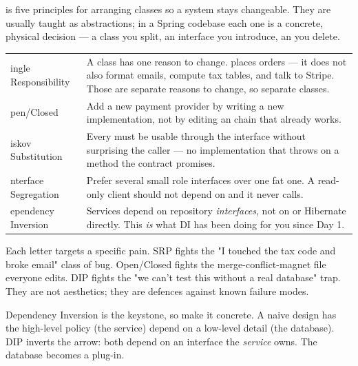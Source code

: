 

  is five principles for arranging classes so a system stays changeable. They are usually taught as abstractions; in a Spring codebase each one is a concrete, physical decision --- a class you split, an interface you introduce, an  you delete.

\begin{center}\small
\begin{tabularx}{\linewidth}{@{}L{34mm} X@{}}
 & \\\midrule
{}ingle Responsibility & A class has one reason to change.  places orders --- it does not also format emails, compute tax tables, and talk to Stripe. Those are separate reasons to change, so separate classes.\\
pen/Closed & Add a new payment provider by writing a new  implementation, not by editing an  chain that already works.\\
iskov Substitution & Every  must be usable through the interface without surprising the caller --- no implementation that throws on a method the contract promises.\\
nterface Segregation & Prefer several small role interfaces over one fat one. A read-only client should not depend on  and  it never calls.\\
ependency Inversion & Services depend on repository \emph{interfaces}, not on  or Hibernate directly. This \emph{is} what DI has been doing for you since Day 1.\\
\end{tabularx}\end{center}

 Each letter targets a specific pain. SRP fights the "I touched the tax code and broke email" class of bug. Open/Closed fights the merge-conflict-magnet file everyone edits. DIP fights the "we can't test this without a real database" trap. They are not aesthetics; they are defences against known failure modes.

 Dependency Inversion is the keystone, so make it concrete. A naive design has the high-level policy (the service) depend on a low-level detail (the database). DIP inverts the arrow: both depend on an interface the \emph{service} owns. The database becomes a plug-in.

